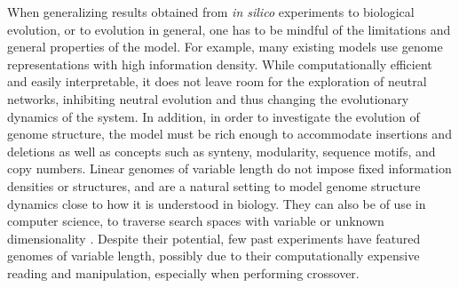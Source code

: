 \documentclass[10pt]{article}
\renewcommand{\paragraph}[1]{\textbf{#1}\hspace{2ex}}
\renewcommand{\paragraph}[1]{}
\begin{document}
\paragraph{Need for variable-length genomes}
When generalizing results obtained from \textit{in silico} experiments to
biological evolution, or to evolution in general, one has to be mindful of the limitations
and general properties of the model. For example, many existing models use genome
representations with high information density. While computationally efficient
and easily interpretable, it does not leave room for the exploration of neutral
networks, inhibiting neutral evolution and thus changing the evolutionary dynamics
of the system. In addition, in order to investigate the evolution of genome
structure, the model must be rich enough to accommodate insertions and deletions
 as well as concepts such as synteny, modularity, sequence motifs, and
copy numbers.
Linear genomes of variable length do not impose fixed information densities or
structures, and are a natural setting to model genome structure dynamics close
to how it is understood in biology. They can also be of use
in computer science, to traverse search spaces with variable or unknown
dimensionality \cite{lee2000,hutt2007}.
Despite their potential, few past experiments have featured genomes of variable
length, possibly due to their computationally expensive reading and manipulation,
especially when performing crossover.

\end{document}
